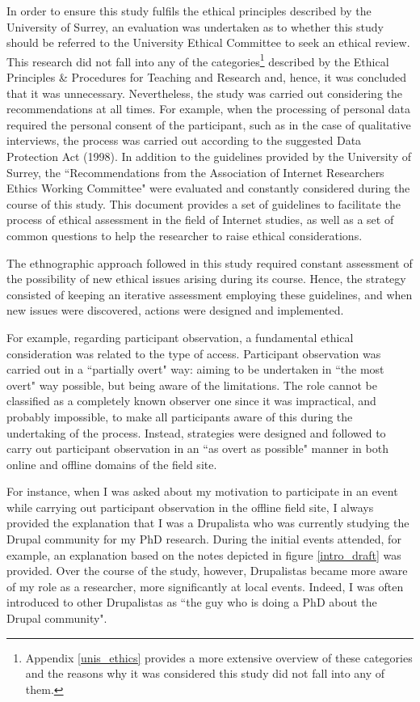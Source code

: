 In order to ensure this study fulfils the ethical principles described by the University of Surrey, an evaluation was undertaken as to whether this study should be referred to the University Ethical Committee to seek an ethical review. This research did not fall into any of the categories\footnote{Appendix \ref{unis_ethics} provides a more extensive overview of these categories and the reasons why it was considered this study did not fall into any of them.} described by the Ethical Principles \& Procedures for Teaching and Research \parencite[4-5]{UEC2013} and, hence, it was concluded that it was unnecessary. Nevertheless, the study was carried out considering the recommendations at all times. For example, when the processing of personal data required the personal consent of the participant, such as in the case of qualitative interviews, the process was carried out according to the suggested Data Protection Act (1998). In addition to the guidelines provided by the University of Surrey, the ``Recommendations from the Association of Internet Researchers Ethics Working Committee" \parencite{markham2012} were evaluated and constantly considered during the course of this study. This document provides a set of guidelines to facilitate the process of ethical assessment in the field of Internet studies, as well as a set of common questions to help the researcher to raise ethical considerations.

The ethnographic approach followed in this study required constant assessment of the possibility of new ethical issues arising during its course. Hence, the strategy consisted of keeping an iterative assessment employing these guidelines, and when new issues were discovered, actions were designed and implemented.

For example, regarding participant observation, a fundamental ethical consideration was related to the type of access. Participant observation was carried out in a ``partially overt" way: aiming to be undertaken in ``the most overt" way possible, but being aware of the limitations. The role cannot be classified as a completely known observer one since it was impractical, and probably impossible, to make all participants aware of this during the undertaking of the process. Instead, strategies were designed and followed to carry out participant observation in an ``as overt as possible" manner in both online and offline domains of the field site.

For instance, when I was asked about my motivation to participate in an event while carrying out participant observation in the offline field site, I always provided the explanation that I was a Drupalista who was currently studying the Drupal community for my PhD research. During the initial events attended, for example, an explanation based on the notes depicted in figure \ref{intro_draft} was provided. Over the course of the study, however, Drupalistas became more aware of my role as a researcher, more significantly at local events. Indeed, I was often introduced to other Drupalistas as ``the guy who is doing a PhD about the Drupal community". 

